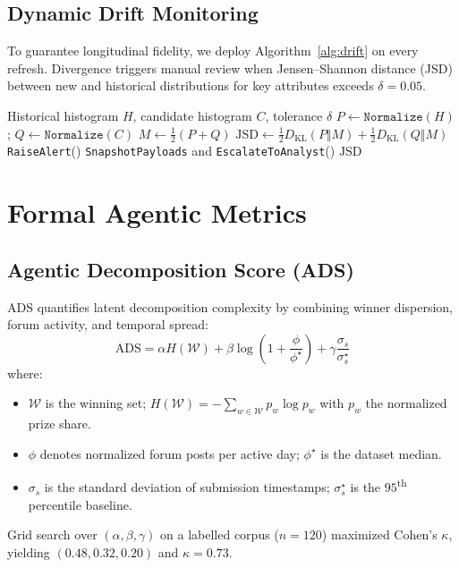 \documentclass[11pt]{article}
\begin{document}
\subsection{Dynamic Drift Monitoring}
To guarantee longitudinal fidelity, we deploy Algorithm~\ref{alg:drift} on every refresh. Divergence triggers manual review when Jensen--Shannon distance (JSD) between new and historical distributions for key attributes exceeds $\delta = 0.05$.

\begin{algorithm}[h]
\caption{Distribution Drift Sentry}
\label{alg:drift}
\begin{algorithmic}[1]
\Require Historical histogram $H$, candidate histogram $C$, tolerance $\delta$
\State $P \gets \texttt{Normalize}(H)$; $Q \gets \texttt{Normalize}(C)$
\State $M \gets \frac{1}{2}(P + Q)$
\State $\text{JSD} \gets \frac{1}{2} D_{\mathrm{KL}}(P \Vert M) + \frac{1}{2} D_{\mathrm{KL}}(Q \Vert M)$
  \State \texttt{RaiseAlert}()
  \State \texttt{SnapshotPayloads} and \texttt{EscalateToAnalyst}()
\EndIf
\State \Return $\text{JSD}$
\end{algorithmic}
\end{algorithm}

\section{Formal Agentic Metrics}
\subsection{Agentic Decomposition Score (ADS)}
ADS quantifies latent decomposition complexity by combining winner dispersion, forum activity, and temporal spread:
\[
  \mathrm{ADS} = \alpha H(\mathcal{W}) + \beta \log\!\left(1 + \frac{\phi}{\phi^\star}\right) + \gamma \frac{\sigma_s}{\sigma^\star_s}
\]
where:
\begin{itemize}[leftmargin=*]
  \item $\mathcal{W}$ is the winning set; $H(\mathcal{W}) = -\sum_{w \in \mathcal{W}} p_w \log p_w$ with $p_w$ the normalized prize share.
  \item $\phi$ denotes normalized forum posts per active day; $\phi^\star$ is the dataset median.
  \item $\sigma_s$ is the standard deviation of submission timestamps; $\sigma^\star_s$ is the $95$\textsuperscript{th} percentile baseline.
\end{itemize}
Grid search over $(\alpha,\beta,\gamma)$ on a labelled corpus ($n=120$) maximized Cohen's $\kappa$, yielding $(0.48, 0.32, 0.20)$ and $\kappa=0.73$.
\end{document}

